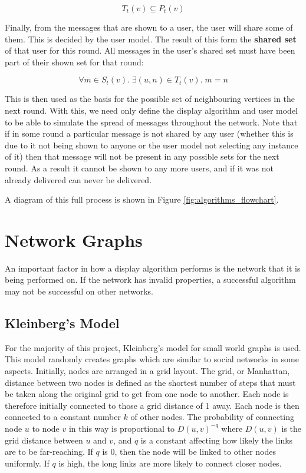 \documentclass[bsc,frontabs,twoside,singlespacing,parskip,deptreport]{infthesis}     %
\begin{document}
\begin{equation}
T_{t}(v) \subseteq P_{t}(v)
\end{equation}

Finally, from the messages that are shown to a user, the user will share some of them. This is decided by the user model. The result of this form the \textbf{shared set} of that user for this round. All messages in the user's shared set must have been part of their shown set for that round:

\begin{equation}
\forall m \in S_{t}(v) .\; \exists (u, n) \in T_{t}(v) .\; m = n
\end{equation}

This is then used as the basis for the possible set of neighbouring vertices in the next round. With this, we need only define the display algorithm and user model to be able to simulate the spread of messages throughout the network. Note that if in some round a particular message is not shared by any user (whether this is due to it not being shown to anyone or the user model not selecting any instance of it) then that message will not be present in any possible sets for the next round. As a result it cannot be shown to any more users, and if it was not already delivered can never be delivered. 

A diagram of this full process is shown in Figure \ref{fig:algorithms_flowchart}.

\section{Network Graphs} \label{sec:graph_def}
An important factor in how a display algorithm performs is the network that it is being performed on. If the network has invalid properties, a successful algorithm may not be successful on other networks.

\subsection{Kleinberg's Model}

For the majority of this project, Kleinberg's model for small world graphs is used\cite{Kleinberg00}. This model randomly creates graphs which are similar to social networks in some aspects. Initially, nodes are arranged in a grid layout. The grid, or Manhattan, distance between two nodes is defined as the shortest number of steps that must be taken along the original grid to get from one node to another. Each node is therefore initially connected to those a grid distance of 1 away. Each node is then connected to a constant number $k$ of other nodes. The probability of connecting node $u$ to node $v$ in this way is proportional to $D(u, v)^{-q}$ where $D(u, v)$ is the grid distance between $u$ and $v$, and $q$ is a constant affecting how likely the links are to be far-reaching. If $q$ is 0, then the node will be linked to other nodes uniformly. If $q$ is high, the long links are more likely to connect closer nodes.
\end{document}
